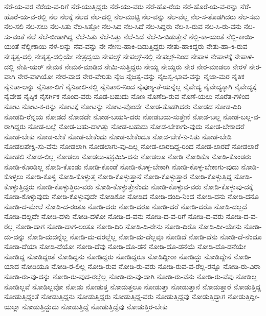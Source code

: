 {ನೆರೆ-ಯ-ವರ
ನೆರೆಯ-ವ-ರಿಗೆ
ನೆರೆ-ಯುತ್ತಿದ್ದರು
ನೆರೆ-ಯು-ವರು
ನೆರೆ-ಹೊ-ರೆಯ
ನೆರೆ-ಹೊರೆ-ಯ-ವ-ರನ್ನು
ನೆರೆ-ಹೊರೆ-ಯ-ವ-ರಲ್ಲಿ
ನೆಲ
ನೆಲಕ್ಕೆ
ನೆಲದ
ನೆಲ-ದಲ್ಲಿ
ನೆಲ-ಮುಟ್ಟಿ
ನೆಲ-ವನ್ನು
ನೆಲ-ವೆಲ್ಲ
ನೆಲ-ಸ-ತೊಡಗಿದರು
ನೆಲ-ಸಮ
ನೆಲ-ಸಲಿ
ನೆಲ-ಸಲು
ನೆಲ-ಸಿತು
ನೆಲ-ಸಿತ್ತೋ
ನೆಲ-ಸಿದ
ನೆಲ-ಸಿದೆ
ನೆಲ-ಸಿದ್ದರು
ನೆಲ-ಸಿ-ರುವ
ನೆಲ-ಸಿ-ರು-ವನು
ನೆಲ-ಸು-ವಂತೆ
ನೆಲೆ
ನೆಲೆ-ಬೀಡಾಗಿದ್ದ
ನೆಲೆ-ಸಿತು
ನೆಲೆ-ಸಿತ್ತು
ನೆಲೆ-ಸಿದೆ
ನೆಲೆ-ಸಿ-ಬಿಡುತ್ತೇನೆ
ನೆಲ್ಲಿ-ಕಾ-ಯಂತೆ
ನೆಲ್ಲಿ-ಕಾಯಿ-ಯಂತೆ
ನೆಲ್ಲೀಕಾಯಿ
ನೆಳ-ಲನ್ನು
ನೆವ-ವನ್ನು
ನೇ
ನೇಣು-ಹಾಕಿ-ಬಿಡುತ್ತಿದ್ದರು
ನೇತು-ಹಾಕಿದ್ದರು
ನೇತು-ಹಾ-ಕಿ-ರುವ
ನೇತೃತ್ವ-ದಲ್ಲಿ
ನೇತೃತ್ವ-ದಲ್ಲಿಯೇ
ನೇತ್ರದ್ವಯ
ನೇಪಲ್ಸ್
ನೇಪಲ್ಸ್-ನಲ್ಲಿ
ನೇಪಲ್ಸ್-ನಿಂದ
ನೇಪಾಳ
ನೇಪಾಳಕ್ಕೆ
ನೇಪಾಳ-ದಲ್ಲಿ
ನೇಪಿ-ಯರ್
ನೇಮಕ
ನೇಮಕ-ಮಾಡಿದ
ನೇಮಿ-ಸುತ್ತಿದ್ದರು
ನೇಯ್ದ
ನೇಯ್ದರು
ನೇರ
ನೇರ-ಮಾಡಲು
ನೇರಳೆ
ನೇರ-ವಾಗಿ
ನೇರ-ವಾಗಿಯೋ
ನೇರ-ವಾದ
ನೇರ-ವೇರಿತು
ನೈಜ
ನೈಜತ್ವ-ವನ್ನು
ನೈಜಸ್ವ-ಭಾವ-ವನ್ನು
ನೈಜಾ-ಮರ
ನೈತಿಕ
ನೈನಿತಾ-ಲನ್ನು
ನೈನಿತಾ-ಲಿಗೆ
ನೈನಿತಾಲಿ-ನಲ್ಲಿ
ನೈನಿತಾಲಿ-ನಿಂದ
ನೈಪುಣ್ಯ-ತೆ-ಯನ್ನೆಲ್ಲ
ನೈವೇದ್ಯ
ನೈವೇದ್ಯಕ್ಕಾಗಿ
ನೈವೇದ್ಯಕ್ಕೆ
ನೈವೇಹ
ನೈಷ್ಠಿಕ
ನೈಸರ್ಗಿಕ
ನೊಂದ-ವರು
ನೊಡ-ಬಹುದು
ನೊಣ
ನೊಣೆದಿ-ರುವ
ನೊಣೆ-ಯಲು
ನೊರೆತ-ಗಳಿಂದ
ನೋಟ
ನೋಟ-ಕ-ರನ್ನು
ನೋಟಕ್ಕೆ
ನೋಟನ್ನು
ನೋಟ-ವೊಂದೇ
ನೋಡ-ತೊಡಗಿದರು
ನೋಡದ
ನೋಡ-ದಿರಿ
ನೋಡದಿ-ರೆನ್ನಯ
ನೋಡದೆ
ನೋಡದೇ
ನೋಡ-ಬಯಸಿ-ದರು
ನೋಡಬಯ-ಸುತ್ತೇನೆ
ನೋಡ-ಬಲ್ಲ
ನೋಡ-ಬಲ್ಲ-ವ-ರಾಗಿದ್ದರು
ನೋಡ-ಬಲ್ಲೆ
ನೋಡ-ಬಹು-ದಾಗಿತ್ತು
ನೋಡ-ಬಹುದು
ನೋಡ-ಬೇಕಾಗು-ವುದು
ನೋಡ-ಬೇಕಾದರೆ
ನೋಡ-ಬೇಕು
ನೋಡ-ಬೇಕೆ
ನೋಡ-ಬೇಕೆಂದು
ನೋಡ-ಬೇಕೆಂದೂ
ನೋಡ-ಬೇಕೆ-ನಿ-ಸಿತು
ನೋಡ-ಬೇಡಿ
ನೋಡಲಪೇಕ್ಷಿ-ಸು-ವೆನು
ನೋಡಲಾಗಿ
ನೋಡಲಾಗು-ವು-ದಿಲ್ಲ
ನೋಡ-ಲಾರದಿದ್ದ-ರಿಂದ
ನೋಡ-ಲಾರದೆ
ನೋಡಲಾರೆ
ನೋಡಲಿ
ನೋಡ-ಲಿಲ್ಲ
ನೋಡಲು
ನೋಡಲು-ಪಕ್ರಮಿಸಿ-ದನು
ನೋಡಲೂ
ನೋಡಿ
ನೋಡಿಕೊ
ನೋಡಿ-ಕೊಂಡರು
ನೋಡಿ-ಕೊಂಡಿಲ್ಲ
ನೋಡಿ-ಕೊಂಡು
ನೋಡಿ-ಕೊಂಡೆ
ನೋಡಿ-ಕೊಳ್ಳ-ಬೇಕಾಗಿ
ನೋಡಿ-ಕೊಳ್ಳ-ಬೇಕಾಗು-ವುದು
ನೋಡಿ-ಕೊಳ್ಳಲು
ನೋಡಿ-ಕೊಳ್ಳಿ
ನೋಡಿ-ಕೊಳ್ಳುತ್ತ
ನೋಡಿ-ಕೊಳ್ಳುತ್ತಾನೆ
ನೋಡಿ-ಕೊಳ್ಳುತ್ತಾರೆ
ನೋಡಿ-ಕೊಳ್ಳುತ್ತಿದ್ದ
ನೋಡಿ-ಕೊಳ್ಳುತ್ತಿದ್ದರು
ನೋಡಿ-ಕೊಳ್ಳುತ್ತಿರು-ವರು
ನೋಡಿ-ಕೊಳ್ಳುತ್ತೇನೆಂದು
ನೋಡಿ-ಕೊಳ್ಳುವ-ವರು
ನೋಡಿ-ಕೊಳ್ಳುವು-ದಕ್ಕೆ
ನೋಡಿ-ಕೊಳ್ಳುವುದು
ನೋಡಿ-ಕೊಳ್ಳುವುದೇ
ನೋಡಿಕೋ
ನೋಡಿದ
ನೋಡಿ-ದಂದಿ-ನಿಂದ
ನೋಡಿ-ದನು
ನೋಡಿ-ದನೊ
ನೋಡಿ-ದ-ಮೇಲೆ
ನೋಡಿ-ದ-ರಂತೂ
ನೋಡಿ-ದರು
ನೋಡಿ-ದರೂ
ನೋಡಿ-ದರೆ
ನೋಡಿ-ದರೊ
ನೋಡಿ-ದಲ್ಲದೆ
ನೋಡಿ-ದಲ್ಲದೇ
ನೋಡಿ-ದಳು
ನೋಡಿ-ದಳೋ
ನೋಡಿ-ದ-ವನು
ನೋಡಿ-ದ-ವ-ರಿಗೆ
ನೋಡಿ-ದ-ವರು
ನೋಡಿ-ದ-ವ-ರೆಲ್ಲ
ನೋಡಿ-ದಾಗ
ನೋಡಿ-ದಾಗ-ಲಂತೂ
ನೋಡಿ-ದಿರಿ
ನೋಡಿ-ದಿ-ರೇನು
ನೋಡಿ-ದಿರೊ
ನೋಡಿ-ದೀ-ಯೇನು
ನೋಡಿ-ದು-ದನ್ನು
ನೋಡಿ-ದುದನ್ನೆಲ್ಲ
ನೋಡಿ-ದು-ದರಲ್ಲೆಲ್ಲ
ನೋಡಿ-ದು-ದೆಲ್ಲವೂ
ನೋಡಿದೆ
ನೋಡಿ-ದೆನು
ನೋಡಿ-ದೆ-ನೆಂದೂ
ನೋಡಿ-ದೆಯಾ
ನೋಡಿ-ದೆಯೋ
ನೋಡಿ-ದೆವು
ನೋಡಿ-ದೊ-ಡನೆ
ನೋಡಿ-ದೊ-ಡನೆಯೆ
ನೋಡಿ-ದೊ-ಡನೆಯೇ
ನೋಡಿದ್ದ
ನೋಡಿದ್ದಂತೆ
ನೋಡಿದ್ದನು
ನೋಡಿದ್ದರು
ನೋಡಿದ್ದರೂ
ನೋಡಿದ್ದೀರಾ
ನೋಡಿದ್ದು
ನೋಡಿದ್ದೇನೆ
ನೋಡಿ-ಯಾದ
ನೋಡಿಯೂ
ನೋಡಿ-ರ-ಲಿಲ್ಲ
ನೋಡಿ-ರುವ
ನೋಡಿ-ರು-ವರು
ನೋಡಿ-ರುವ-ವ-ರೆಲ್ಲ-ರನ್ನೂ
ನೋಡಿ-ರು-ವಿರಾ
ನೋಡಿ-ರು-ವು-ದನ್ನು
ನೋಡಿ-ರು-ವುದ-ರಲ್ಲೆಲ್ಲ
ನೋಡಿ-ರು-ವು-ದಾಗಿ
ನೋಡಿ-ರು-ವೆನು
ನೋಡಿ-ರು-ವೆವು
ನೋಡಿಲ್ಲ
ನೋಡಿಲ್ಲವೆ
ನೋಡಿಲ್ಲವೋ
ನೋಡು
ನೋಡುತ್ತ
ನೋಡುತ್ತಲೂ
ನೋಡುತ್ತಾ
ನೋಡುತ್ತಾನೆ
ನೋಡುತ್ತಾರೆ
ನೋಡುತ್ತಿದ್ದ
ನೋಡುತ್ತಿದ್ದಂತೆ
ನೋಡುತ್ತಿದ್ದನು
ನೋಡುತ್ತಿದ್ದರು
ನೋಡುತ್ತಿದ್ದ-ವರು
ನೋಡುತ್ತಿದ್ದವು
ನೋಡುತ್ತಿದ್ದಾಗ
ನೋಡುತ್ತಿದ್ದೀ-ಯಲ್ಲಾ
ನೋಡುತ್ತಿದ್ದುದು
ನೋಡುತ್ತಿದ್ದೆ
ನೋಡುತ್ತಿದ್ದೆವು
ನೋಡುತ್ತಿರ-ಬೇಕು
}
